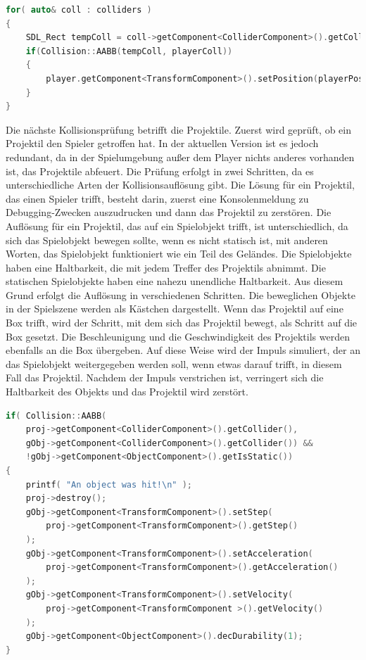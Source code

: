 \documentclass[
  10pt,
  a4paper,
  oneside,
  headers,
  headinclude,
  footinclude,
  BCOR5mm,
]{article}
\begin{document}
\begin{lstlisting}[language=C++]
for( auto& coll : colliders )
{
    SDL_Rect tempColl = coll->getComponent<ColliderComponent>().getCollider();
    if(Collision::AABB(tempColl, playerColl))
    {
        player.getComponent<TransformComponent>().setPosition(playerPos);
    }
}
\end{lstlisting}

Die nächste Kollisionsprüfung betrifft die Projektile. Zuerst wird geprüft, ob
ein Projektil den Spieler getroffen hat. In der aktuellen Version ist es jedoch
redundant, da in der Spielumgebung außer dem Player nichts anderes vorhanden
ist, das Projektile abfeuert. Die Prüfung erfolgt in zwei Schritten, da es
unterschiedliche Arten der Kollisionsauflösung gibt. Die Lösung für ein
Projektil, das einen Spieler trifft, besteht darin, zuerst eine Konsolenmeldung
zu Debugging-Zwecken auszudrucken und dann das Projektil zu zerstören. Die
Auflösung für ein Projektil, das auf ein Spielobjekt trifft, ist
unterschiedlich, da sich das Spielobjekt bewegen sollte, wenn es nicht statisch
ist, mit anderen Worten, das Spielobjekt funktioniert wie ein Teil des Geländes.
Die Spielobjekte haben eine Haltbarkeit, die mit jedem Treffer des Projektils
abnimmt. Die statischen Spielobjekte haben eine nahezu unendliche Haltbarkeit.
Aus diesem Grund erfolgt die Auflösung in verschiedenen Schritten. Die
beweglichen Objekte in der Spielszene werden als Kästchen dargestellt. Wenn das
Projektil auf eine Box trifft, wird der Schritt, mit dem sich das Projektil
bewegt, als Schritt auf die Box gesetzt. Die Beschleunigung und die
Geschwindigkeit des Projektils werden ebenfalls an die Box übergeben. Auf diese
Weise wird der Impuls simuliert, der an das Spielobjekt weitergegeben werden
soll, wenn etwas darauf trifft, in diesem Fall das Projektil. Nachdem der Impuls
verstrichen ist, verringert sich die Haltbarkeit des Objekts und das Projektil
wird zerstört.

\begin{lstlisting}[language=C++]
if( Collision::AABB(
    proj->getComponent<ColliderComponent>().getCollider(),
    gObj->getComponent<ColliderComponent>().getCollider()) &&
    !gObj->getComponent<ObjectComponent>().getIsStatic())
{
    printf( "An object was hit!\n" );
    proj->destroy();
    gObj->getComponent<TransformComponent>().setStep(
        proj->getComponent<TransformComponent>().getStep()
    );
    gObj->getComponent<TransformComponent>().setAcceleration(
        proj->getComponent<TransformComponent>().getAcceleration()
    );
    gObj->getComponent<TransformComponent>().setVelocity(
        proj->getComponent<TransformComponent >().getVelocity()
    );
    gObj->getComponent<ObjectComponent>().decDurability(1);
}
\end{lstlisting}
\end{document}
